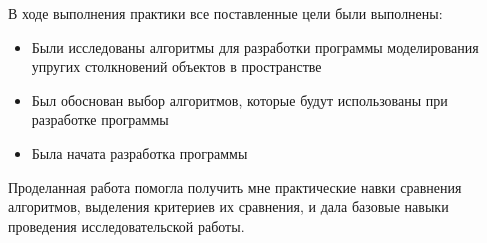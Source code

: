 \newpage
{}

В ходе выполнения практики все поставленные цели были выполнены:
\begin{itemize}
    \item Были исследованы алгоритмы для разработки программы моделирования упругих столкновений объектов в пространстве
    \item Был обоснован выбор алгоритмов, которые будут использованы при разработке программы
    \item Была начата разработка программы
\end{itemize}

Проделанная работа помогла получить мне практические навки сравнения
алгоритмов, выделения критериев их сравнения, и дала базовые навыки проведения
исследовательской работы.
